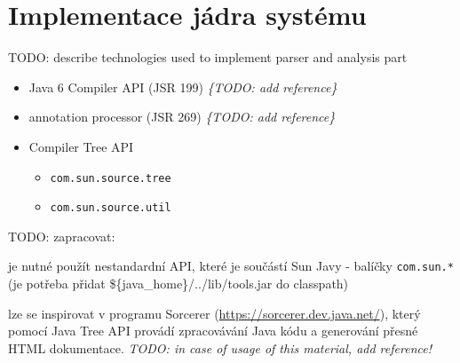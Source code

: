 \section{Implementace jádra systému}
TODO: describe technologies used to implement parser and analysis part
\begin{itemize}
\item Java 6 Compiler API (JSR 199) \emph{\{TODO: add reference\}}
\item annotation processor (JSR 269) \emph{\{TODO: add reference\}}
\item Compiler Tree API
  \begin{itemize}
  \item \verb+com.sun.source.tree+ 
  \item \verb+com.sun.source.util+
  \end{itemize}
\end{itemize}

TODO: zapracovat:

je nutné použít nestandardní API, které je součástí Sun Javy - balíčky \verb+com.sun.*+ (je potřeba přidat \$\{java\_home\}/../lib/tools.jar do classpath)

lze se inspirovat v programu Sorcerer (\href{https://sorcerer.dev.java.net/}{https://sorcerer.dev.java.net/}), který pomocí Java Tree API provádí zpracovávání Java kódu a generování přesné HTML dokumentace. \emph{TODO: in case of usage of this material, add reference!}
